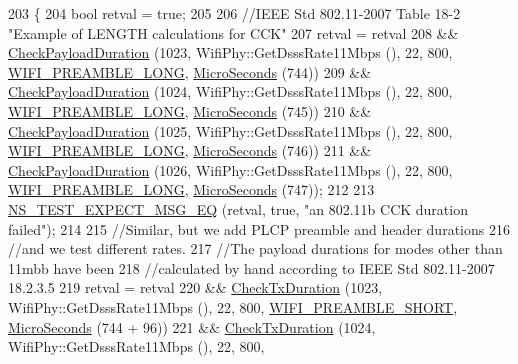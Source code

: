 \begin{DoxyCode}
203 \{
204   \textcolor{keywordtype}{bool} retval = \textcolor{keyword}{true};
205 
206   \textcolor{comment}{//IEEE Std 802.11-2007 Table 18-2 "Example of LENGTH calculations for CCK"}
207   retval = retval
208     && \hyperlink{classTxDurationTest_a3b56291189e8cfa83d41503d7fbd6d6c}{CheckPayloadDuration} (1023, WifiPhy::GetDsssRate11Mbps (), 22, 800, 
      \hyperlink{group__wifi_gga5e94a56cb338a14ffbbb19c6a41251eba12f3d9468d1630bd38bbef20df1e3eda}{WIFI\_PREAMBLE\_LONG}, \hyperlink{group__timecivil_ga17465a639c8d1464e76538afdd78a9f0}{MicroSeconds} (744))
209     && \hyperlink{classTxDurationTest_a3b56291189e8cfa83d41503d7fbd6d6c}{CheckPayloadDuration} (1024, WifiPhy::GetDsssRate11Mbps (), 22, 800, 
      \hyperlink{group__wifi_gga5e94a56cb338a14ffbbb19c6a41251eba12f3d9468d1630bd38bbef20df1e3eda}{WIFI\_PREAMBLE\_LONG}, \hyperlink{group__timecivil_ga17465a639c8d1464e76538afdd78a9f0}{MicroSeconds} (745))
210     && \hyperlink{classTxDurationTest_a3b56291189e8cfa83d41503d7fbd6d6c}{CheckPayloadDuration} (1025, WifiPhy::GetDsssRate11Mbps (), 22, 800, 
      \hyperlink{group__wifi_gga5e94a56cb338a14ffbbb19c6a41251eba12f3d9468d1630bd38bbef20df1e3eda}{WIFI\_PREAMBLE\_LONG}, \hyperlink{group__timecivil_ga17465a639c8d1464e76538afdd78a9f0}{MicroSeconds} (746))
211     && \hyperlink{classTxDurationTest_a3b56291189e8cfa83d41503d7fbd6d6c}{CheckPayloadDuration} (1026, WifiPhy::GetDsssRate11Mbps (), 22, 800, 
      \hyperlink{group__wifi_gga5e94a56cb338a14ffbbb19c6a41251eba12f3d9468d1630bd38bbef20df1e3eda}{WIFI\_PREAMBLE\_LONG}, \hyperlink{group__timecivil_ga17465a639c8d1464e76538afdd78a9f0}{MicroSeconds} (747));
212 
213   \hyperlink{group__testing_ga7304ba46a28d8cf08dfdfd6499cf7068}{NS\_TEST\_EXPECT\_MSG\_EQ} (retval, \textcolor{keyword}{true}, \textcolor{stringliteral}{"an 802.11b CCK duration failed"});
214 
215   \textcolor{comment}{//Similar, but we add PLCP preamble and header durations}
216   \textcolor{comment}{//and we test different rates.}
217   \textcolor{comment}{//The payload durations for modes other than 11mbb have been}
218   \textcolor{comment}{//calculated by hand according to  IEEE Std 802.11-2007 18.2.3.5}
219   retval = retval
220     && \hyperlink{classTxDurationTest_ac86b852957ecf1a1bed4f4e48debb30e}{CheckTxDuration} (1023, WifiPhy::GetDsssRate11Mbps (), 22, 800, 
      \hyperlink{group__wifi_gga5e94a56cb338a14ffbbb19c6a41251ebab9a39ca1f62d36c33ac489c4cf59745b}{WIFI\_PREAMBLE\_SHORT}, \hyperlink{group__timecivil_ga17465a639c8d1464e76538afdd78a9f0}{MicroSeconds} (744 + 96))
221     && \hyperlink{classTxDurationTest_ac86b852957ecf1a1bed4f4e48debb30e}{CheckTxDuration} (1024, WifiPhy::GetDsssRate11Mbps (), 22, 800, 

\end{DoxyCode}
